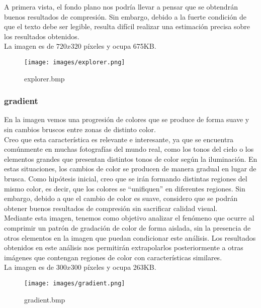 \documentclass[12pt,a4paper]{article}
\begin{document}
A primera vista, el fondo plano nos podría llevar a pensar que se obtendrán buenos resultados de compresión. Sin embargo, debido a la fuerte condición de que el texto debe ser legible, resulta difícil realizar una estimación precisa sobre los resultados obtenidos.\\

La imagen es de $720x320$ píxeles y ocupa 675KB.\\

\begin{figure}[H]
    \centering
    \texttt{[image: images/explorer.png]}
    \caption{explorer.bmp}
    
\end{figure}


\subsubsection{gradient}
En la imagen vemos una progresión de colores que se produce de forma suave y sin cambios bruscos entre zonas de distinto color.\\

Creo que esta característica es relevante e interesante, ya que se encuentra comúnmente en muchas fotografías del mundo real, como los tonos del cielo o los elementos grandes que presentan distintos tonos de color según la iluminación. En estas situaciones, los cambios de color se producen de manera gradual en lugar de brusca. Como hipótesis inicial, creo que se irán formando distintas regiones del mismo color, es decir, que los colores se ``unifiquen'' en diferentes regiones. Sin embargo, debido a que el cambio de color es suave, considero que se podrán obtener buenos resultados de compresión sin sacrificar calidad visual.\\ 

Mediante esta imagen, tenemos como objetivo analizar el fenómeno que ocurre al comprimir un patrón de gradación de color de forma aislada, sin la presencia de otros elementos en la imagen que puedan condicionar este análisis. Los resultados obtenidos en este análisis nos permitirán extrapolarlos posteriormente a otras imágenes que contengan regiones de color con características similares.\\

La imagen es de $300x300$ píxeles y ocupa 263KB.\\

\begin{figure}[H]
    \centering
    \texttt{[image: images/gradient.png]}
    \caption{gradient.bmp}
    
\end{figure}
\end{document}

